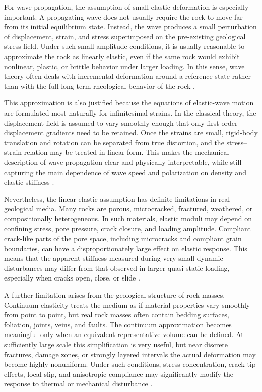 For wave propagation, the assumption of small elastic deformation is especially important. A propagating wave does not usually require the rock to move far from its initial equilibrium state. Instead, the wave produces a small perturbation of displacement, strain, and stress superimposed on the pre-existing geological stress field. Under such small-amplitude conditions, it is usually reasonable to approximate the rock as linearly elastic, even if the same rock would exhibit nonlinear, plastic, or brittle behavior under larger loading. In this sense, wave theory often deals with incremental deformation around a reference state rather than with the full long-term rheological behavior of the rock \cite{mavko2009,aki2002}.

This approximation is also justified because the equations of elastic-wave motion are formulated most naturally for infinitesimal strains. In the classical theory, the displacement field is assumed to vary smoothly enough that only first-order displacement gradients need to be retained. Once the strains are small, rigid-body translation and rotation can be separated from true distortion, and the stress--strain relation may be treated in linear form. This makes the mechanical description of wave propagation clear and physically interpretable, while still capturing the main dependence of wave speed and polarization on density and elastic stiffness \cite{aki2002,mavko2009}.

Nevertheless, the linear elastic assumption has definite limitations in real geological media. Many rocks are porous, microcracked, fractured, weathered, or compositionally heterogeneous. In such materials, elastic moduli may depend on confining stress, pore pressure, crack closure, and loading amplitude. Compliant crack-like parts of the pore space, including microcracks and compliant grain boundaries, can have a disproportionately large effect on elastic response. This means that the apparent stiffness measured during very small dynamic disturbances may differ from that observed in larger quasi-static loading, especially when cracks open, close, or slide \cite{mavko2009,jaeger2007}.

A further limitation arises from the geological structure of rock masses. Continuum elasticity treats the medium as if material properties vary smoothly from point to point, but real rock masses often contain bedding surfaces, foliation, joints, veins, and faults. The continuum approximation becomes meaningful only when an equivalent representative volume can be defined. At sufficiently large scale this simplification is very useful, but near discrete fractures, damage zones, or strongly layered intervals the actual deformation may become highly nonuniform. Under such conditions, stress concentration, crack-tip effects, local slip, and anisotropic compliance may significantly modify the response to thermal or mechanical disturbance \cite{cornet2007,jaeger2007,schultz2019}.

